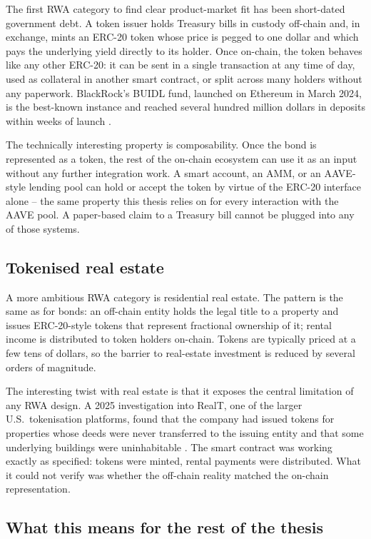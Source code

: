 The first RWA category to find clear product-market fit has been
short-dated government debt. A token issuer holds Treasury bills in
custody off-chain and, in exchange, mints an ERC-20 token whose price is
pegged to one dollar and which pays the underlying yield directly to its
holder. Once on-chain, the token behaves like any other ERC-20: it can be
sent in a single transaction at any time of day, used as collateral in
another smart contract, or split across many holders without any paperwork.
BlackRock's BUIDL fund, launched on Ethereum in March 2024, is the
best-known instance and reached several hundred million dollars in
deposits within weeks of launch \cite{blackrockBuidl2024,coindeskBuidl2024}.

The technically interesting property is composability. Once the bond is
represented as a token, the rest of the on-chain ecosystem can use it as
an input without any further integration work. A smart account, an AMM, or
an AAVE-style lending pool can hold or accept the token by virtue of the
ERC-20 interface alone -- the same property this thesis relies on for
every interaction with the AAVE pool. A paper-based claim to a Treasury
bill cannot be plugged into any of those systems.

\subsection{Tokenised real estate}

A more ambitious RWA category is residential real estate. The pattern is
the same as for bonds: an off-chain entity holds the legal title to a
property and issues ERC-20-style tokens that represent fractional
ownership of it; rental income is distributed to token holders on-chain.
Tokens are typically priced at a few tens of dollars, so the barrier to
real-estate investment is reduced by several orders of magnitude.

The interesting twist with real estate is that it exposes the central
limitation of any RWA design. A 2025 investigation into RealT, one of the
larger U.S.\ tokenisation platforms, found that the company had issued
tokens for properties whose deeds were never transferred to the issuing
entity and that some underlying buildings were uninhabitable
\cite{realtInvestigation2025}. The smart contract was working exactly as
specified: tokens were minted, rental payments were distributed. What it
could not verify was whether the off-chain reality matched the on-chain
representation.

\subsection{What this means for the rest of the thesis}

